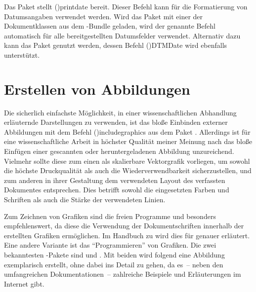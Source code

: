 \documentclass[%
  english,ngerman,%
  cdgeometry=no,DIV=12,%
  cd=false,cdfont=false,cdtitle=true,%
  headings=normal,%
  automark,%
  listof=toc,%
]{tudscrartcl}
\begin{document}
Das Paket  stellt \Macro(){printdate} bereit. 
Dieser Befehl kann für die Formatierung von Datumsangaben verwendet werden. 
Wird das Paket mit einer der Dokumentklassen aus dem \TUDScript-Bundle geladen, 
wird der genannte Befehl automatisch für alle bereitgestellten Datumsfelder 
verwendet. Alternativ dazu kann das Paket  genutzt werden, 
dessen Befehl \Macro(){DTMDate} wird ebenfalls unterstützt.
%
\begin{Preamble}
\usepackage{isodate}

\end{Preamble}



\section{%
  Erstellen von Abbildungen%
  \label{sec:figures}%
}

Die sicherlich einfachste Möglichkeit, in einer wissenschaftlichen Abhandlung 
erläuternde Darstellungen zu verwenden, ist das bloße Einbinden externer 
Abbildungen mit dem Befehl \Macro(){includegraphics} aus dem 
Paket . 
Allerdings ist für eine wissenschaftliche Arbeit in höchster Qualität meiner 
Meinung nach das bloße Einfügen einer gescannten oder heruntergeladenen 
Abbildung unzureichend. Vielmehr sollte diese zum einen als skalierbare 
Vektorgrafik vorliegen, um sowohl die höchste Druckqualität als auch die 
Wiederverwendbarkeit sicherzustellen, und zum anderen in ihrer Gestaltung dem 
verwendeten Layout des verfassten Dokumentes entsprechen. Dies betrifft sowohl 
die eingesetzten Farben und Schriften als auch die Stärke der verwendeten 
Linien.

Zum Zeichnen von Grafiken sind die freien Programme  und 
besonders  empfehlenswert, da diese die Verwendung der 
Dokumentschriften innerhalb der erstellten Grafiken ermöglichen. Im Handbuch zu 
\TUDScript wird dies für  
genauer erläutert. Eine andere Variante ist das \enquote{Programmieren} von 
Grafiken. Die zwei bekanntesten -Pakete sind 
und . Mit beiden wird folgend eine Abbildung exemplarisch 
erstellt, ohne dabei ins Detail zu gehen, da es~-- neben den umfangreichen 
Dokumentationen~-- zahlreiche Beispiele und Erläuterungen im Internet gibt.
\end{document}
